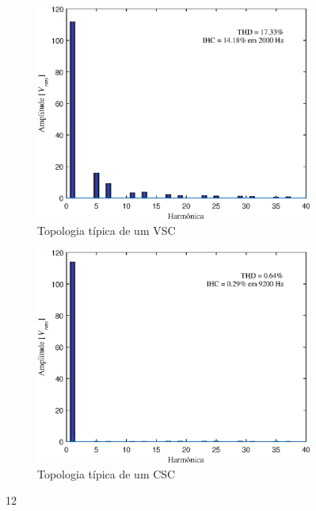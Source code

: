 \begin{figure}[!htb] %
	\centering
	\begin{subfigure}[b]{0.48\textwidth}
		\centering
		\includegraphics[width=\textwidth]{Cap4/Figuras/resultados_unfilt_12.eps}
		\caption{Topologia típica de um VSC} 
		\label{fig:resultados_unfilt_12.eps}
	\end{subfigure}%
		\hfill
	\begin{subfigure}[b]{0.48\textwidth}  
		\centering 
		\includegraphics[width=\textwidth]{Cap4/Figuras/resultados_filt_12.eps}
		\caption{Topologia típica de um CSC}    
		\label{fig:resultados_filt_12.eps}
	\end{subfigure}%
	\caption{12}
	\label{fig:12}
\end{figure}

